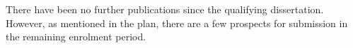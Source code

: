 There have been no further publications since the qualifying
dissertation. However, as mentioned in the plan, there are a few
prospects for submission in the remaining enrolment period.
